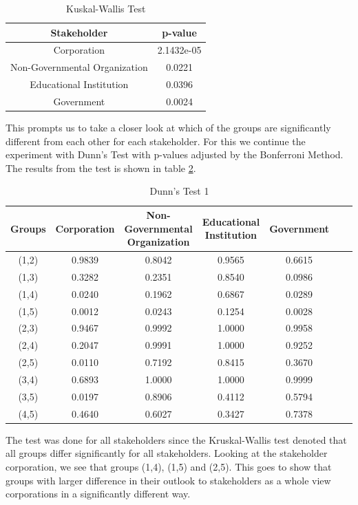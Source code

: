 \begin{table}[h!]
  \centering
  \caption{Kuskal-Wallis Test}
  \label{tab:kw_stak}
  \begin{tabular}{cc}
    \toprule
     Stakeholder & p-value \\
    \midrule
    Corporation & 2.1432e-05 \\
    Non-Governmental Organization & 0.0221\\
    Educational Institution & 0.0396\\
    Government & 0.0024\\ 
    \bottomrule
  \end{tabular}
\end{table}

This prompts us to take a closer look at which of the groups are significantly different from each other for each stakeholder. For this we continue the experiment with Dunn's Test with p-values adjusted by the Bonferroni Method. The results from the test is shown in table \ref{tab:dunn_stak}.

\begin{table}[h!]
  \centering
  \caption{Dunn's Test 1}
  \label{tab:dunn_stak}
  \begin{tabular}{ccccccc}
    \toprule
     Groups & Corporation & Non-Governmental Organization & Educational Institution & Government \\
    \midrule
    (1,2) & 0.9839 & 0.8042 & 0.9565 & 0.6615 \\
    (1,3) & 0.3282 & 0.2351 & 0.8540 & 0.0986 \\
    (1,4) & 0.0240 & 0.1962 & 0.6867 & 0.0289 \\
    (1,5) & 0.0012 & 0.0243 & 0.1254 & 0.0028 \\
    (2,3) & 0.9467 & 0.9992 & 1.0000 & 0.9958 \\
    (2,4) & 0.2047 & 0.9991 & 1.0000 & 0.9252  \\
    (2,5) & 0.0110 & 0.7192 & 0.8415 & 0.3670  \\
    (3,4) & 0.6893 & 1.0000 & 1.0000 & 0.9999 \\
    (3,5) & 0.0197 & 0.8906 & 0.4112 & 0.5794  \\
    (4,5) & 0.4640 & 0.6027 & 0.3427 & 0.7378 \\
    \bottomrule
  \end{tabular}
\end{table}  

The test was done for all stakeholders since the Kruskal-Wallis test denoted that all groups differ significantly for all stakeholders. Looking at the stakeholder corporation, we see that groups (1,4), (1,5) and (2,5). This goes to show that groups with larger difference in their outlook to stakeholders as a whole view corporations in a significantly different way.

